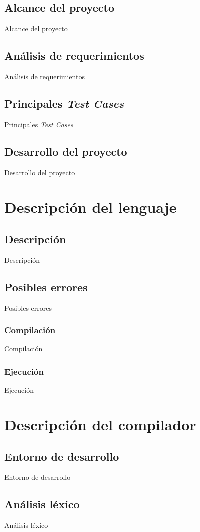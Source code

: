 \documentclass[12pt,letterpaper, titlepage, onecolumn]{article}
\begin{document}
	\subsection{Alcance del proyecto}
	Alcance del proyecto
	\subsection{Análisis de requerimientos}
	Análisis de requerimientos
	\subsection{Principales \textsl{Test Cases}}
	Principales \textsl{Test Cases}
	\subsection{Desarrollo del proyecto}
	Desarrollo del proyecto

\section{Descripción del lenguaje}
	\subsection{Descripción}
	Descripción
	\subsection{Posibles errores}
	Posibles errores
	\subsubsection{Compilación}
	Compilación
	\subsubsection{Ejecución}
	Ejecución

\section{Descripción del compilador}
	\subsection{Entorno de desarrollo}
	Entorno de desarrollo
	\subsection{Análisis léxico}
	Análisis léxico
\end{document}
